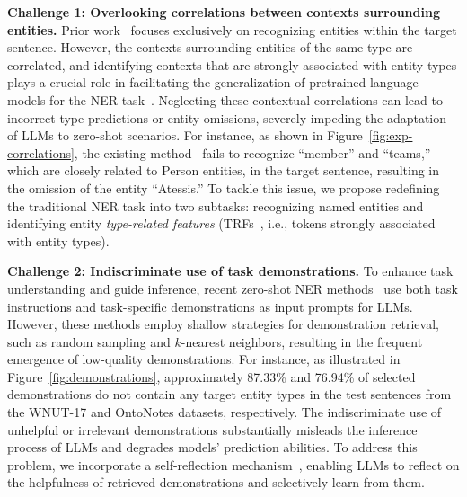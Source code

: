\noindent \textbf{Challenge 1: Overlooking correlations between contexts surrounding entities.}
Prior work~\citep{wei2023zero,DBLP:conf/emnlp/XieLZZLW23, DBLP:journals/corr/abs-2311-08921} focuses exclusively on recognizing entities within the target sentence. However, the contexts surrounding entities of the same type are correlated, and identifying contexts that are strongly associated with entity types plays a crucial role in facilitating the generalization of pretrained language models for the \ac{NER} task~\citep{DBLP:conf/emnlp/WangZCRRR23}. Neglecting these contextual correlations can lead to incorrect type predictions or entity omissions, severely impeding the adaptation of \acp{LLM} to zero-shot scenarios. For instance, as shown in Figure~\ref{fig:exp-correlations}, the existing method~\citep{DBLP:conf/emnlp/XieLZZLW23} fails to recognize ``member'' and ``teams,'' which are closely related to Person entities, in the target sentence, resulting in the omission of the entity ``Atessis.''
To tackle this issue, we propose redefining the traditional \ac{NER} task into two subtasks: recognizing named entities and identifying entity \emph{type-related features} (\acp{TRF}~\citep{DBLP:conf/emnlp/WangZCRRR23}, i.e., tokens strongly associated with entity types). 

\noindent \textbf{Challenge 2: Indiscriminate use of task demonstrations.}
To enhance task understanding and guide inference, recent zero-shot \ac{NER} methods~\citep{DBLP:conf/emnlp/XieLZZLW23,DBLP:journals/corr/abs-2311-08921} use both task instructions and task-specific demonstrations as input prompts for \acp{LLM}. 
However, these methods employ shallow strategies for demonstration retrieval, such as random sampling and $k$-nearest neighbors, resulting in the frequent emergence of low-quality demonstrations.
For instance, as illustrated in Figure~\ref{fig:demonstrations}, approximately 87.33\% and 76.94\% of selected demonstrations do not contain any target entity types in the test sentences from the WNUT-17 and OntoNotes datasets, respectively. 
The indiscriminate use of unhelpful or irrelevant demonstrations substantially misleads the inference process of \acp{LLM} and degrades models' prediction abilities.
To address this problem, we incorporate a self-reflection mechanism~\citep{DBLP:conf/iclr/AsaiWWSH24,DBLP:conf/nips/ShinnCGNY23}, enabling LLMs to reflect on the helpfulness of retrieved demonstrations and selectively learn from them.

